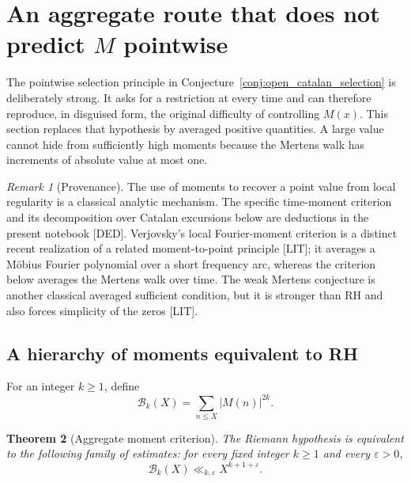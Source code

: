 \documentclass[11pt]{amsart}
\numberwithin{equation}{section}
\theoremstyle{plain}
\newtheorem{theorem}{Theorem}[section]
\theoremstyle{definition}
\theoremstyle{remark}
\newtheorem{remark}[theorem]{Remark}
\newcommand{\Mert}{M}
\newcommand{\eps}{\varepsilon}
\begin{document}
\section{An aggregate route that does not predict $\Mert$ pointwise}
\label{sec:aggregate_moment_route}

The pointwise selection principle in
Conjecture~\ref{conj:open_catalan_selection} is deliberately strong.  It asks
for a restriction at every time and can therefore reproduce, in disguised
form, the original difficulty of controlling $\Mert(x)$.  This section replaces
that hypothesis by averaged positive quantities.  A large value cannot hide
from sufficiently high moments because the Mertens walk has increments of
absolute value at most one.

\begin{remark}[Provenance]
\label{rem:aggregate_provenance}
The use of moments to recover a point value from local regularity is a classical
analytic mechanism.  The specific time-moment criterion and its decomposition
over Catalan excursions below are deductions in the present notebook
\textnormal{[DED]}.  Verjovsky's local Fourier-moment criterion is a distinct
recent realization of a related moment-to-point principle \cite{Verjovsky2026}
\textnormal{[LIT]}; it averages a M\"obius Fourier polynomial over a short
frequency arc, whereas the criterion below averages the Mertens walk over
time.  The weak Mertens conjecture is another classical averaged sufficient
condition, but it is stronger than RH and also forces simplicity of the zeros
\cite{Ng2004} \textnormal{[LIT]}.
\end{remark}

\subsection{A hierarchy of moments equivalent to RH}

For an integer $k\geq1$, define
\begin{equation}
\mathcal B_k(X)=\sum_{n\leq X}|\Mert(n)|^{2k}.
\label{eq:ordinary_time_moment}
\end{equation}

\begin{theorem}[Aggregate moment criterion]
\label{thm:aggregate_moment_criterion}
The Riemann hypothesis is equivalent to the following family of estimates: for
every fixed integer $k\geq1$ and every $\eps>0$,
\begin{equation}
\mathcal B_k(X)
\ll_{k,\eps}X^{k+1+\eps}.
\label{eq:aggregate_moment_bound}
\end{equation}
\end{theorem}
\end{document}
